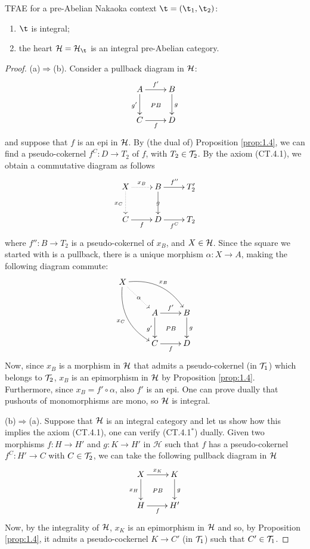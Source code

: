 \begin{thm}
TFAE for a pre-Abelian Nakaoka context $\t=(\t_1,\t_2)$:
\begin{enumerate}[label=(\alph*)]
\item $\t$ is integral;
\item the heart $\H=\H_\t$ is an integral pre-Abelian category.
\end{enumerate}
\end{thm}
\begin{proof}
(a)$\Rightarrow$(b). Consider a pullback diagram in $\mathcal H$:
\[
\xymatrix{
A\ar@{}[dr]|{PB}\ar[r]^{f'}\ar[d]_{g'}&B\ar[d]^g\\
C\ar[r]_{f}&D
}
\]
and suppose that $f$ is an epi in $\mathcal H$. By (the dual of) Proposition \ref{prop:1.4}, we can find a pseudo-cokernel $f^C\colon D\to T_2$ of $f$, with $T_2\in \mathcal T_2$. By the axiom (CT.4.1), we obtain a commutative diagram as follows 
\[
\xymatrix{
X\ar@{.>}[d]_{x_C}\ar@{.>}[r]^{x_B}&B\ar[r]^{f''}\ar[d]|{g}&T'_2\\
C\ar[r]_f&D\ar[r]_{f^C}&T_2
}
\]
where $f''\colon B\to T_2$ is a pseudo-cokernel of $x_B$, and $X\in \mathcal H$. Since the square we started with is a pullback, there is a unique morphism $\alpha\colon X\to A$, making the following diagram commute:
\[
\xymatrix{
X\ar@/_15pt/[ddr]_{x_C}\ar@/_-15pt/[rrd]^{x_B}\ar@{.>}[dr]|\alpha\\
&A\ar@{}[dr]|{PB}\ar[r]^{f'}\ar[d]_{g'}&B\ar[d]^g\\
&C\ar[r]_{f}&D
}
\]
Now, since $x_B$ is a morphism in $\mathcal H$ that admits a pseudo-cokernel (in $\mathcal T_1$) which belongs to $\mathcal T_2$, $x_B$ is an epimorphism in $\mathcal H$ by Proposition \ref{prop:1.4}. Furthermore, since $x_B=f'\circ\alpha$, also $f'$ is an epi. One can prove dually that pushouts of monomorphisms are mono, so $\mathcal H$ is integral. 

\smallskip\noindent
(b)$\Rightarrow$(a). Suppose that $\mathcal H$ is an integral category and let us show how this implies the axiom (CT.4.1), one can verify (CT.4.1$^*$) dually. Given two morphisms $f\colon H\to H'$ and $g\colon K\to H'$ in $\mathcal{H}$ such that $f$ has a pseudo-cokernel $f^C\colon H'\to C$ with $C\in \mathcal T_2$, we can take the following pullback diagram in $\mathcal H$
\[
\xymatrix{
X\ar[d]_{x_H}\ar[r]^{x_K}\ar@{}[dr]|{PB}&K\ar[d]^{g}\\
H\ar[r]_f&H'
}
\]
Now, by the integrality of $\mathcal H$, $x_K$ is an epimorphism in $\mathcal H$ and so, by Proposition \ref{prop:1.4}, it admits a pseudo-cockernel $K\to C'$ (in $\mathcal T_1$) such that $C'\in \mathcal T_1$.
\end{proof}


